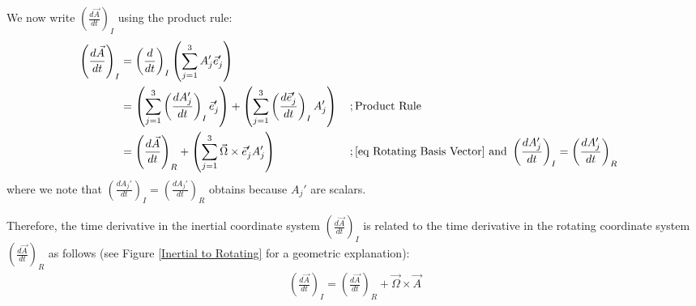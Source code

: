 \vspace{2mm}
We now write \(\left(\frac{d\vec{A}}{d t}\right)_{I}\) using the product rule:
\begin{align*}
    \left(\frac{d\vec{A}}{d t}\right)_{I}
    &=
    \left(\frac{d}{d t}\right)_{I}
    \left( \sum_{j=1}^{3} A_j'\vec{e}_j' \right)
    \\
    &=
    \left( \sum_{j=1}^{3} \left(\frac{d A_j'}{d t}\right)_{I} \vec{e}_j' \right)
    +
    \left( \sum_{j=1}^{3} \left(\frac{d \vec{e}_j'}{d t}\right)_{I} A_j' \right)
    &\,\text{;}\,
    &\text{Product Rule}
    \\
    &=
    \left( \frac{d \vec{A}}{d t} \right)_{R} 
    +
    \left( \sum_{j=1}^{3} \vec{\Omega}\times\vec{e}_j' A_j' \right)
    &\,\text{;}\,
    &\text{\ref{eq Rotating Basis Vector} and }\left( \frac{d A_j'}{d t} \right)_I = \left( \frac{d A_j'}{d t} \right)_R
\end{align*}
where we note that \(\left( \frac{d A_j'}{d t} \right)_I = \left( \frac{d A_j'}{d t} \right)_R\) obtains because \(A_j'\) are scalars.

Therefore, the time derivative in the inertial coordinate system \(\left(\frac{d\vec{A}}{d t}\right)_I\) is related to the time derivative in the rotating coordinate system \(\left(\frac{d\vec{A}}{d t}\right)_R\) as follows (see Figure \ref{Inertial to Rotating} for a geometric explanation):
\begin{align}
    \left(\frac{d\vec{A}}{d t}\right)_I=\left(\frac{d\vec{A}}{d t}\right)_R+\vec{\Omega}\times\vec{A}
    \label{Rotating Relation}
\end{align}

